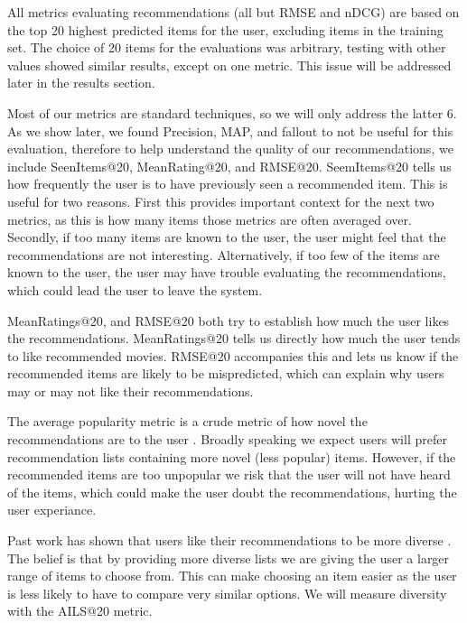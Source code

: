 \documentclass[letterpaper]{sig-alternate}
\begin{document}
  All metrics evaluating recommendations (all but RMSE and nDCG) are based on the top 20 highest predicted items for the user, excluding items in the training set.
  The choice of 20 items for the evaluations was arbitrary, testing with other values showed similar results, except on one metric.
  This issue will be addressed later in the results section.
  
  Most of our metrics are standard techniques, so we will only address the latter 6.
  As we show later, we found Precision, MAP, and fallout to not be useful for this evaluation, therefore to help understand the quality of our recommendations, we include SeenItems@20, MeanRating@20, and RMSE@20.
  SeemItems@20 tells us how frequently the user is to have previously seen a recommended item.
  This is useful for two reasons.
  First this provides important context for the next two metrics, as this is how many items those metrics are often averaged over.
  Secondly, if too many items are known to the user, the user might feel that the recommendations are not interesting.
  Alternatively, if too few of the items are known to the user, the user may have trouble evaluating the recommendations, which could lead the user to leave the system.

  \addtocounter{footnote}{1}

  MeanRatings@20, and RMSE@20 both try to establish how much the user likes the recommendations.
  MeanRatings@20 tells us directly how much the user tends to like recommended movies.
  RMSE@20 accompanies this and lets us know if the recommended items are likely to be mispredicted, which can explain why users may or may not like their recommendations.

  The average popularity metric is a crude metric of how novel the recommendations are to the user \cite{zieglerDiversity}.
  Broadly speaking we expect users will prefer recommendation lists containing more novel (less popular) items.
  However, if the recommended items are too unpopular we risk that the user will not have heard of the items, which could make the user doubt the recommendations, hurting the user experiance.

  Past work has shown that users like their recommendations to be more diverse \cite{zieglerDiversity, martijnDiversity}.
  The belief is that by providing more diverse lists we are giving the user a larger range of items to choose from.
  This can make choosing an item easier as the user is less likely to have to compare very similar options.
  We will measure diversity with the AILS@20 metric.
\end{document}
